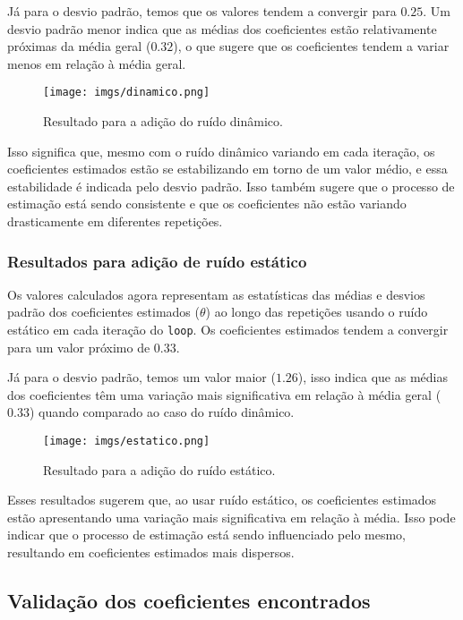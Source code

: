\documentclass[a4paper,12pt]{article}
\begin{document}
Já para o desvio padrão, temos que os valores tendem a convergir para  $0.25$. Um desvio padrão menor indica que as médias dos coeficientes estão relativamente próximas da média geral ($0.32$), o que sugere que os coeficientes tendem a variar menos em relação à média geral.
\begin{figure}[h!]\label{fig16}
  \centering
  \texttt{[image: imgs/dinamico.png]}
  \caption{Resultado para a adição do ruído dinâmico.}
\end{figure}

Isso significa que, mesmo com o ruído dinâmico variando em cada iteração, os coeficientes estimados estão se estabilizando em torno de um valor médio, e essa estabilidade é indicada pelo desvio padrão. Isso também sugere que o processo de estimação está sendo consistente e que os coeficientes não estão variando drasticamente em diferentes repetições.

\subsubsection{Resultados para adição de ruído estático}

Os valores calculados agora representam as estatísticas das médias e desvios padrão dos coeficientes estimados ($\theta$) ao longo das repetições usando o ruído estático em cada iteração do \texttt{loop}. Os coeficientes estimados tendem a convergir para um valor próximo de $0.33$.

Já para o desvio padrão, temos um valor maior ($1.26$), isso indica que as médias dos coeficientes têm uma variação mais significativa em relação à média geral ($0.33$) quando comparado ao caso do ruído dinâmico.
\begin{figure}[h!]\label{fig17}
  \centering
  \texttt{[image: imgs/estatico.png]}
  \caption{Resultado para a adição do ruído estático.}
\end{figure}
\newpage
Esses resultados sugerem que, ao usar ruído estático, os coeficientes estimados estão apresentando uma variação mais significativa em relação à média. Isso pode indicar que o processo de estimação está sendo influenciado pelo mesmo, resultando em coeficientes estimados mais dispersos. 

\subsection{Validação dos coeficientes encontrados}\label{4.6}
\end{document}
